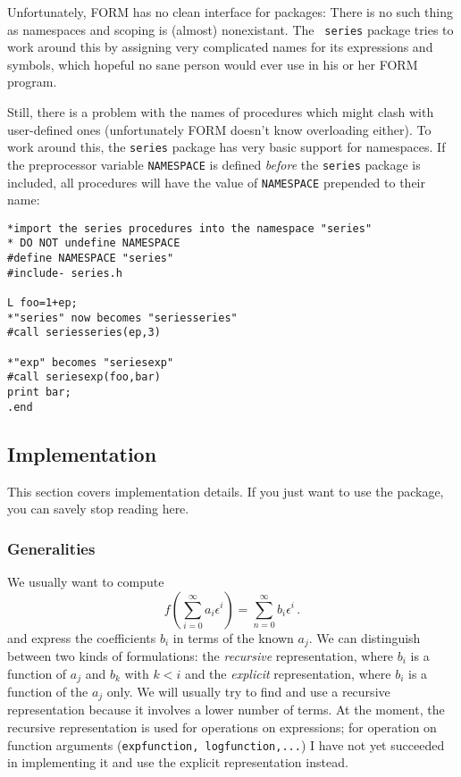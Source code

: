 \documentclass{article}
\begin{document}
Unfortunately, FORM has no clean interface for packages: There is no
such thing as namespaces and scoping is (almost) nonexistant. The {\tt
  series} package tries to work around this by assigning very complicated
names for its expressions and symbols, which hopeful no sane person
would ever use in his or her FORM program.

Still, there is a problem with the names of procedures which might clash
with user-defined ones (unfortunately FORM doesn't know overloading
either). To work around this, the {\tt series} package has very basic
support for namespaces. If the preprocessor variable {\tt NAMESPACE} is
defined {\em before} the {\tt series} package is included, all
procedures will have the value of {\tt NAMESPACE} prepended to their name:
\begin{verbatim}
*import the series procedures into the namespace "series"
* DO NOT undefine NAMESPACE
#define NAMESPACE "series"
#include- series.h

L foo=1+ep;
*"series" now becomes "seriesseries"
#call seriesseries(ep,3)

*"exp" becomes "seriesexp"
#call seriesexp(foo,bar)
print bar;
.end
\end{verbatim}

\subsection{Implementation}
\label{sec:impl}

This section covers implementation details. If you just want to use the
package, you can savely stop reading here.

\subsubsection{Generalities}
\label{sec:impl_general}


 We usually want to compute
\begin{equation}
  \label{eq:def}
  f\left(\sum_{i=0}^{\infty}a_i \epsilon^i\right)=\sum_{n=0}^\infty b_i \epsilon^i\,.
\end{equation}
and express the coefficients $b_i$ in terms of the known $a_j$. We can
distinguish between two kinds of formulations: the {\it recursive} representation,
where $b_i$ is a function of $a_j$ and $b_k$ with $k < i$ and the {\it
  explicit} representation, where $b_i$ is a function of the $a_j$ only.
We will usually try to find and use a recursive representation because
it involves a lower number of terms. At the moment, the recursive
representation is used for operations on expressions; for operation
on function arguments ({\tt expfunction, logfunction,...}) I have not yet succeeded in
implementing it and use the explicit representation instead.
\end{document}
